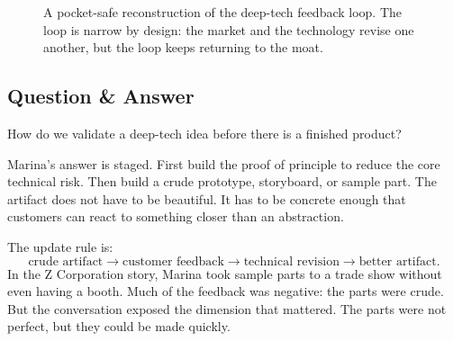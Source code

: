 \begin{figure}
\centering
{}
\caption{A pocket-safe reconstruction of the deep-tech feedback loop. The loop is narrow by design: the market and the technology revise one another, but the loop keeps returning to the moat.}
\end{figure}

\subsection{Question \& Answer}

How do we validate a deep-tech idea before there is a finished product?

Marina's answer is staged. First build the proof of principle to reduce the core technical risk. Then build a crude prototype, storyboard, or sample part. The artifact does not have to be beautiful. It has to be concrete enough that customers can react to something closer than an abstraction.

The update rule is:
\begin{equation}
\text{crude artifact}
\longrightarrow
\text{customer feedback}
\longrightarrow
\text{technical revision}
\longrightarrow
\text{better artifact}.
\end{equation}
In the Z Corporation story, Marina took sample parts to a trade show without even having a booth. Much of the feedback was negative: the parts were crude. But the conversation exposed the dimension that mattered. The parts were not perfect, but they could be made quickly.

